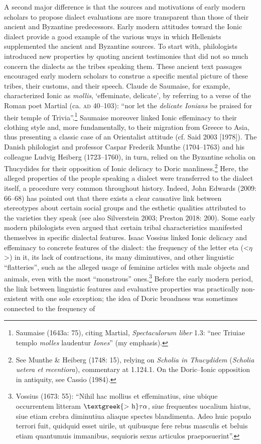 \begin{styleStandard}
A second major difference is that the sources and motivations of early modern scholars to propose dialect evaluations are more transparent than those of their ancient and Byzantine predecessors. Early modern attitudes toward the Ionic dialect provide a good example of the various ways in which Hellenists supplemented the ancient and Byzantine sources. To start with, philologists introduced new properties by quoting ancient testimonies that did not so much concern the dialects as the tribes speaking them. These ancient text passages encouraged early modern scholars to construe a specific mental picture of these tribes, their customs, and their speech. Claude de Saumaise, for example, characterized Ionic as \textit{mollis}, ‘effeminate, delicate’, by referring to a verse of the Roman poet Martial (ca. \textsc{ad} 40–103): “nor let the \textit{delicate Ionians} be praised for their temple of Trivia”.\footnote{ Saumaise (1643a: 75), citing Martial, \textit{Spectaculorum liber} 1.3: “nec Triuiae templo \textit{molles} laudentur \textit{Iones}” (my emphasis).} Saumaise moreover linked Ionic effeminacy to their clothing style and, more fundamentally, to their migration from Greece to Asia, thus presenting a classic case of an Orientalist attitude (cf. Said 2003 [1978]). The Danish philologist and professor Caspar Frederik Munthe (1704–1763) and his colleague Ludvig Heiberg (1723–1760), in turn, relied on the Byzantine scholia on Thucydides for their opposition of Ionic delicacy to Doric manliness.\footnote{ See Munthe \& Heiberg (1748: 15), relying on \textit{Scholia in Thucydidem} (\textit{Scholia uetera et recentiora}),\textit{ }commentary at 1.124.1. On the Doric–Ionic opposition in antiquity, see Cassio (1984).} Here, the alleged properties of the people speaking a dialect were transferred to the dialect itself, a procedure very common throughout history. Indeed, John Edwards (2009: 66–68) has pointed out that there exists a clear causative link between stereotypes about certain social groups and the esthetic qualities attributed to the varieties they speak (see also Silverstein 2003; Preston 2018: 200). Some early modern philologists even argued that certain tribal characteristics manifested themselves in specific dialectal features. Isaac Vossius linked Ionic delicacy and effeminacy to concrete features of the dialect: the frequency of the letter eta ({\textless}$\eta ${\textgreater}) in it, its lack of contractions, its many diminutives, and other linguistic “flatteries”, such as the alleged usage of feminine articles with male objects and animals, even with the most “monstrous” ones.\footnote{ Vossius (1673: 55): “Nihil hac mollius et effeminatius, siue ubique occurrentem litteram $\text{\textgreek{>~h}}\tau \alpha $, siue frequentes uocalium hiatus, siue etiam crebra diminutiua aliaque spectes blandimenta. Adeo huic populo terrori fuit, quidquid esset uirile, ut quibusque fere rebus masculis et beluis etiam quantumuis immanibus, sequioris sexus articulos praeposuerint”.} Before the early modern period, the link between linguistic features and evaluative properties was practically non-existent with one sole exception; the idea of Doric broadness was sometimes connected to the frequency of 
\end{styleStandard}
